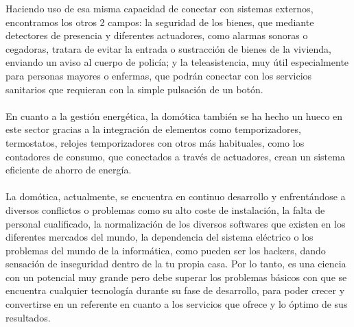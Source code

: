 Haciendo uso de esa misma capacidad de conectar con sistemas externos, encontramos los otros 2 campos: la seguridad de los bienes, que mediante detectores de presencia y diferentes actuadores, como alarmas sonoras o cegadoras, tratara de evitar la entrada o sustracción de bienes de la vivienda, enviando un aviso al cuerpo de policía; y la teleasistencia, muy útil especialmente para personas mayores o enfermas, que podrán conectar con los servicios sanitarios que requieran  con la simple pulsación de un botón.\\\\
En cuanto a la gestión energética, la domótica también se ha hecho un hueco en este sector gracias a la integración de elementos como temporizadores, termostatos, relojes temporizadores con otros más habituales, como los contadores de consumo, que conectados a través de actuadores, crean un sistema eficiente de ahorro de energía.\\\\
La domótica, actualmente, se encuentra en continuo desarrollo y enfrentándose a diversos conflictos o problemas como su alto coste de instalación, la falta de personal cualificado, la normalización de los diversos softwares que existen en los  diferentes mercados del mundo, la dependencia del sistema eléctrico o los problemas del mundo de la informática, como pueden ser los hackers, dando sensación de inseguridad dentro de la tu propia casa. Por lo tanto, es una ciencia con un potencial muy grande pero debe superar los problemas básicos con que se encuentra cualquier tecnología durante su fase de desarrollo, para poder crecer y convertirse en un referente en cuanto a los servicios que ofrece y lo óptimo de sus resultados.
